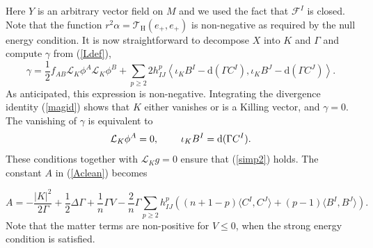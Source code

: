\documentclass[11pt, reqno]{amsart}
\theoremstyle{plain}
\theoremstyle{definition}
\numberwithin{equation}{section}
\begin{document}
Here $Y$ is an arbitrary vector field on $M$ and we used the fact that $\mathcal{F}^I$ is closed. Note that the function $r^2\alpha = \mathcal{T}_\text{H}(e_+,e_+)$ is non-negative as required by the null energy condition. It is now straightforward to decompose $X$ into $K$ and $\Gamma$ and compute $\gamma$ from (\ref{Ldef}),
\begin{equation} \label{L}
    \gamma = \frac 12 f_{AB}\mathcal{L}_K\phi^A\mathcal{L}_K\phi^B + \sum_{p\geq 2} 2h_{IJ}^p\left\langle \iota_K B^I - \text{d}(\Gamma C^I), \iota_K B^J - \text{d}(\Gamma C^J)\right\rangle.
\end{equation}
As anticipated, this expression is non-negative. Integrating the divergence identity (\ref{magid}) shows that $K$ either vanishes or is a Killing vector, and $\gamma = 0$. The vanishing of $\gamma$ is equivalent to 
\begin{equation} \label{easymatter}
    \mathcal{L}_K \phi^A = 0, \hspace{.8cm} \iota_K B^I = \text{d}(\Gamma C^I).
\end{equation}
These conditions together with $\mathcal{L}_K g = 0$ ensure that (\ref{simp2}) holds. The constant $A$ in (\ref{Aclean}) becomes

\begin{equation} 
    A = -\frac{\vert K \vert^2}{2\Gamma} + \frac 12\Delta \Gamma + \frac 1n\Gamma V - \frac 2n\Gamma \sum_{p \geq 2}h_{IJ}^p \left((n+1-p)\langle C^I, C^J\rangle + (p-1) \langle B^I,  B^J\rangle\right).
\end{equation}
Note that the matter terms are non-positive for $V \leq 0$, when the strong energy condition is satisfied. 
\end{document}
